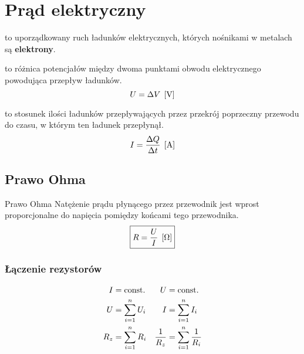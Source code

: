 \chapter{Prąd elektryczny}

\begin{definition}
   to uporządkowany ruch ładunków elektrycznych, których nośnikami w metalach
  są \textbf{elektrony}.
\end{definition}

\begin{definition}
   to różnica potencjałów między dwoma punktami obwodu elektrycznego
  powodująca przepływ ładunków.
  \begin{equation}
    U = \Delta V \;\left[\mathrm{V}\right]
  \end{equation}
\end{definition}

\begin{definition}
   to stosunek ilości ładunków przepływających przez przekrój
  poprzeczny przewodu do czasu, w którym ten ładunek przepłynął.
  \begin{equation}
    I = \frac{\Delta Q}{\Delta t} \;\left[\mathrm{A}\right]
  \end{equation}
\end{definition}

\section{Prawo Ohma}
\begin{law}{Prawo Ohma}
  Natężenie prądu płynącego przez przewodnik jest wprost proporcjonalne do napięcia pomiędzy
  końcami tego przewodnika.
  \begin{equation}
    \boxed{R = \frac U I \;\left[\mathrm{\Omega}\right]}
  \end{equation}
\end{law}

\subsection{Łączenie rezystorów}
\begin{align*}
  I &= \operatorname{const.} & U &= \operatorname{const.}\\
  U &= \sum_{i=1}^n U_i & I &= \sum_{i=1}^n I_i\\
  R_z &= \sum_{i=1}^n R_i & \frac{1}{R_z} &= \sum_{i=1}^n \frac{1}{R_i}
\end{align*}

